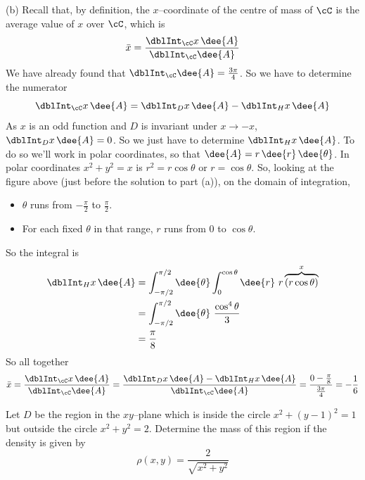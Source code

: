 \begin{solution}
(b)
Recall that, by definition, the $x$--coordinate of the centre of mass
of $\cC$ is the average value of $x$ over $\cC$, which is
\begin{align*}
\bar x = \frac{\dblInt_\cC x\,\dee{A}}{\dblInt_\cC \dee{A}}
\end{align*}
We have already found that $\dblInt_\cC \dee{A}=\frac{3\pi}{4}$. 
So we have to determine the numerator
\begin{equation*}
\dblInt_\cC x\,\dee{A} = \dblInt_D x\,\dee{A} - \dblInt_H x\,\dee{A}
\end{equation*}
As $x$ is an odd function and $D$ is invariant under $x\rightarrow -x$,
$\dblInt_D x\,\dee{A}=0$. So we just have to determine 
$\dblInt_H x\,\dee{A}$.
To do so we'll work in polar coordinates, so that 
$\dee{A} = r\,\dee{r}\,\dee{\theta}$.
In polar coordinates $x^2 + y^2 = x$ is $r^2 =r\cos\theta$
or $r=\cos\theta$. So, looking at the figure above (just before the 
solution to part (a)), on the domain of integration,
\begin{itemize}
\item
$\theta$ runs from $-\frac{\pi}{2}$ to $\frac{\pi}{2}$. 
\item
For each fixed $\theta$ in that range, $r$ runs from $0$ to
$\cos\theta$.
\end{itemize}
So the integral is
\begin{align*}
\dblInt_H x\,\dee{A}
   &= \int_{-\pi/2}^{\pi/2}\dee{\theta}\int_0^{\cos\theta}\dee{r}\ 
           r\overbrace{(r\cos\theta)}^{x} \\
   &=\int_{-\pi/2}^{\pi/2}\dee{\theta} \ \frac{\cos^4\theta}{3} \\
   &= \frac{\pi}{8}
\end{align*}
So all together
\begin{align*}
\bar x = \frac{\dblInt_\cC x\,\dee{A}}{\dblInt_\cC \dee{A}}
       = \frac{\dblInt_D x\,\dee{A} - \dblInt_H x\,\dee{A}}{\dblInt_\cC \dee{A}}
       =\frac{0-\frac{\pi}{8}}{\frac{3\pi}{4}}
       =-\frac{1}{6}
\end{align*}
\end{solution}

\begin{question}[M200 2002D] %
Let $D$ be the region in the $xy$--plane which is inside
the circle $x^2+(y-1)^2=1$ but outside the circle $x^2+y^2=2$. Determine
the mass of this region if the density is given by 
$$
\rho(x,y)=\frac{2}{\sqrt{x^2+y^2}}
$$
\end{question}

